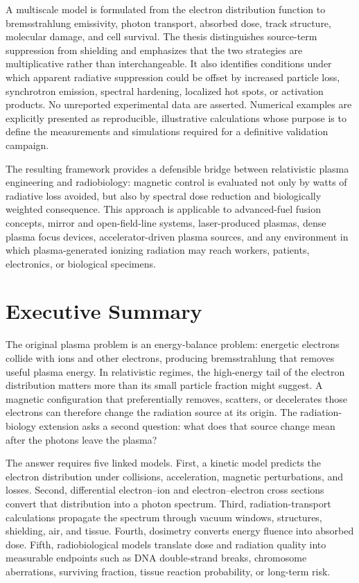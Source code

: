 \documentclass[12pt,oneside]{report}
\theoremstyle{definition}
\begin{document}
A multiscale model is formulated from the electron distribution function to bremsstrahlung emissivity, photon transport, absorbed dose, track structure, molecular damage, and cell survival. The thesis distinguishes source-term suppression from shielding and emphasizes that the two strategies are multiplicative rather than interchangeable. It also identifies conditions under which apparent radiative suppression could be offset by increased particle loss, synchrotron emission, spectral hardening, localized hot spots, or activation products. No unreported experimental data are asserted. Numerical examples are explicitly presented as reproducible, illustrative calculations whose purpose is to define the measurements and simulations required for a definitive validation campaign.

The resulting framework provides a defensible bridge between relativistic plasma engineering and radiobiology: magnetic control is evaluated not only by watts of radiative loss avoided, but also by spectral dose reduction and biologically weighted consequence. This approach is applicable to advanced-fuel fusion concepts, mirror and open-field-line systems, laser-produced plasmas, dense plasma focus devices, accelerator-driven plasma sources, and any environment in which plasma-generated ionizing radiation may reach workers, patients, electronics, or biological specimens.
\clearpage

\chapter*{Executive Summary}
The original plasma problem is an energy-balance problem: energetic electrons collide with ions and other electrons, producing bremsstrahlung that removes useful plasma energy. In relativistic regimes, the high-energy tail of the electron distribution matters more than its small particle fraction might suggest. A magnetic configuration that preferentially removes, scatters, or decelerates those electrons can therefore change the radiation source at its origin. The radiation-biology extension asks a second question: what does that source change mean after the photons leave the plasma?

The answer requires five linked models. First, a kinetic model predicts the electron distribution under collisions, acceleration, magnetic perturbations, and losses. Second, differential electron--ion and electron--electron cross sections convert that distribution into a photon spectrum. Third, radiation-transport calculations propagate the spectrum through vacuum windows, structures, shielding, air, and tissue. Fourth, dosimetry converts energy fluence into absorbed dose. Fifth, radiobiological models translate dose and radiation quality into measurable endpoints such as DNA double-strand breaks, chromosome aberrations, surviving fraction, tissue reaction probability, or long-term risk.
\end{document}
